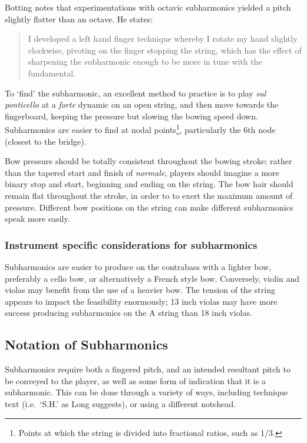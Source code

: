 Botting notes that experimentations with octavic subharmonics yielded a pitch slightly flatter than an octave. He states: \begin{quotation}
  I developed a left hand finger technique whereby I rotate my hand slightly clockwise, pivoting on the finger stopping the string, which has the effect of sharpening the subharmonic enough to be more in tune with the fundamental.\autocite[111]{bottingDevelopingPersonalVocabulary2019}
\end{quotation}

To `find' the subharmonic, an excellent method to practice is to play \emph{sul ponticello} at a \emph{forte} dynamic on an open string, and then move towards the fingerboard, keeping the pressure but slowing the bowing speed down.
Subharmonics are easier to find at nodal points\footnote{Points at which the string is divided into fractional ratios, such as 1/3.}, particularly the 6th node (closest to the bridge).\autocite[]{appleseedFeedbackSightreadingSession2019}

Bow pressure should be totally consistent throughout the bowing stroke; rather than the tapered start and finish of \emph{normale}, players should imagine a more binary stop and start, beginning and ending on the string.
The bow hair should remain flat throughout the stroke, in order to to exert the maximum amount of pressure.\autocite[]{kimuraHowProduceSubharmonics1999}
Different bow positions on the string can make different subharmonics speak more easily.\autocite[]{kimuraHowProduceSubharmonics1999}

\subsubsection{Instrument specific considerations for subharmonics}
Subharmonics are easier to produce on the contrabass with a lighter bow, preferably a cello bow, or alternatively a French style bow.\autocite[]{longSubharmonics2019}
Conversely, violin and violas may benefit from the use of a heavier bow.\autocite[]{appleseedFeedbackSightreadingSession2019}
The tension of the string appears to impact the feasibility enormously; 13 inch violas may have more success producing subharmonics on the A string than 18 inch violas.\autocite[]{appleseedFeedbackSightreadingSession2019}



\subsection{Notation of Subharmonics}\label{sec:notation-subharmonics}
Subharmonics require both a fingered pitch, and an intended resultant pitch to be conveyed to the player, as well as some form of indication that it is a subharmonic.
This can be done through a variety of ways, including technique text (i.e.\ `S.H.' as Long suggests), or using a different notehead.\autocite[]{longSubharmonics2019}

